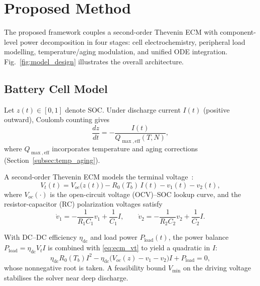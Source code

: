 \documentclass[conference]{IEEEtran}
\begin{document}
\section{Proposed Method}
\label{sec:model}

The proposed framework couples a second-order Thevenin ECM with component-level power decomposition in four stages: cell electrochemistry, peripheral load modelling, temperature/aging modulation, and unified ODE integration. Fig.~\ref{fig:model_design} illustrates the overall architecture.

\subsection{Battery Cell Model}

Let $z(t) \in [0,1]$ denote SOC. Under discharge current $I(t)$ (positive outward), Coulomb counting gives
\begin{equation}
    \frac{dz}{dt} = -\frac{I(t)}{Q_{\max,\mathrm{eff}}(T, N)},
    \label{eq:soc_ode}
\end{equation}
where $Q_{\max,\mathrm{eff}}$ incorporates temperature and aging corrections (Section~\ref{subsec:temp_aging}).

A second-order Thevenin ECM models the terminal voltage~\cite{plett2015battery}:
\begin{equation}
    V_t(t) = V_{oc}\!\bigl(z(t)\bigr) - R_0(T_b)\,I(t) - v_1(t) - v_2(t),
    \label{eq:ecm_vt}
\end{equation}
where $V_{oc}(\cdot)$ is the open-circuit voltage (OCV)--SOC lookup curve, and the resistor-capacitor (RC) polarization voltages satisfy
\begin{equation}
    \dot{v}_1 = -\frac{1}{R_1 C_1}v_1 + \frac{1}{C_1}I,\qquad
    \dot{v}_2 = -\frac{1}{R_2 C_2}v_2 + \frac{1}{C_2}I.
    \label{eq:rc_dyn}
\end{equation}

With DC--DC efficiency $\eta_{\mathrm{dc}}$ and load power $P_{\mathrm{load}}(t)$, the power balance $P_{\mathrm{load}} = \eta_{\mathrm{dc}} V_t I$ is combined with \eqref{eq:ecm_vt} to yield a quadratic in $I$:
\begin{equation}
    \eta_{\mathrm{dc}} R_0(T_b) I^2 - \eta_{\mathrm{dc}}\bigl(V_{oc}(z) - v_1 - v_2\bigr) I + P_{\mathrm{load}} = 0,
    \label{eq:quad_I}
\end{equation}
whose nonnegative root is taken. A feasibility bound $V_{\min}$ on the driving voltage stabilises the solver near deep discharge.
\end{document}
